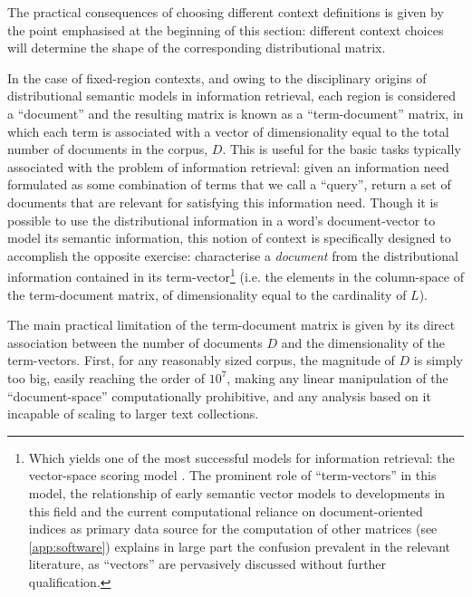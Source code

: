 The practical consequences of choosing different context definitions is given by the point emphasised at the beginning of this section: different context choices will determine the shape of the corresponding distributional matrix.

\label{pp:infret}
In the case of fixed-region contexts, and owing to the disciplinary origins of distributional semantic models in information retrieval, each region is considered a ``document'' and the resulting matrix is known as a ``term-document'' matrix, in which each term is associated with a vector of dimensionality equal to the total number of documents in the corpus, $D$.
This is useful for the basic tasks typically associated with the problem of information retrieval: given an information need formulated as some combination of terms that we call a ``query'', return a set of documents that are relevant for satisfying this information need.
Though it is possible to use the distributional information in a word's document-vector to model its semantic information, this notion of context is specifically designed to accomplish the opposite exercise: characterise a \emph{document} from the distributional information contained in its term-vector\footnote{
    Which yields one of the most successful models for information retrieval: the vector-space scoring model \citep[ch. 6]{manning2008}.
    The prominent role of ``term-vectors'' in this model, the relationship of early semantic vector models to developments in this field and the current computational reliance on document-oriented indices as primary data source for the computation of other matrices (see \autoref{app:software}) explains in large part the confusion prevalent in the relevant literature, as ``vectors''
    are pervasively discussed without further qualification.
} (i.e. the elements in the column-space of the term-document matrix, of dimensionality equal to the cardinality of $L$).

The main practical limitation of the term-document matrix is given by its direct association between the number of documents $D$ and the dimensionality of the term-vectors.
First, for any reasonably sized corpus, the magnitude of $D$ is simply too big, easily reaching the order of $10^7$, making any linear manipulation of the ``document-space'' computationally prohibitive, and any analysis based on it incapable of scaling to larger text collections.


